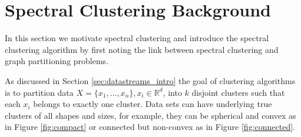 




\section{Spectral Clustering Background}
\label{sec:sc_background}

In this section we motivate spectral clustering and introduce the spectral clustering algorithm by first noting the link between spectral clustering and graph partitioning problems. 


As discussed in Section \ref{sec:datastreams_intro} the goal of clustering algorithms is to partition data  $X = \{ x_1, \ldots, x_n \}, x_i \in \mathbb{R}^d$, into $k$ disjoint clusters such that each $x_i$ belongs to exactly one cluster. Data sets can have underlying true clusters of all shapes and sizes, for example, they can be spherical and convex as in Figure \ref{fig:compact} or connected but non-convex as in Figure \ref{fig:connected}.


